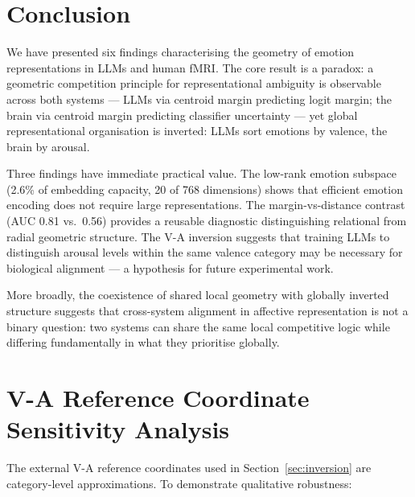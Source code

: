 \documentclass{article}
\begin{document}
\section{Conclusion}

We have presented six findings characterising the geometry of emotion representations
in LLMs and human fMRI.
The core result is a paradox: a geometric competition principle for representational
ambiguity is observable across both systems --- LLMs via centroid margin predicting
logit margin; the brain via centroid margin predicting classifier uncertainty ---
yet global representational organisation is inverted: LLMs sort emotions by valence,
the brain by arousal.

Three findings have immediate practical value.
The low-rank emotion subspace (2.6\% of embedding capacity, 20 of 768 dimensions)
shows that efficient emotion encoding does not require large representations.
The margin-vs-distance contrast (AUC 0.81 vs.\ 0.56) provides a reusable diagnostic
distinguishing relational from radial geometric structure.
The V-A inversion suggests that training LLMs to distinguish arousal levels within the
same valence category may be necessary for biological alignment --- a hypothesis for
future experimental work.

More broadly, the coexistence of shared local geometry with globally inverted structure
suggests that cross-system alignment in affective representation is not a binary
question: two systems can share the same local competitive logic while differing
fundamentally in what they prioritise globally.




\appendix

\section{V-A Reference Coordinate Sensitivity Analysis}
\label{app:va-sensitivity}

The external V-A reference coordinates used in Section~\ref{sec:inversion} are
category-level approximations.
To demonstrate qualitative robustness:
\end{document}
